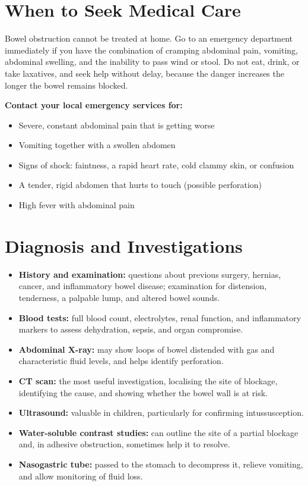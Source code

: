 \section*{When to Seek Medical Care}
Bowel obstruction cannot be treated at home. Go to an emergency department immediately if you have the combination of cramping abdominal pain, vomiting, abdominal swelling, and the inability to pass wind or stool. Do not eat, drink, or take laxatives, and seek help without delay, because the danger increases the longer the bowel remains blocked.

\textbf{Contact your local emergency services for:}
\begin{itemize}
    \item Severe, constant abdominal pain that is getting worse
    \item Vomiting together with a swollen abdomen
    \item Signs of shock: faintness, a rapid heart rate, cold clammy skin, or confusion
    \item A tender, rigid abdomen that hurts to touch (possible perforation)
    \item High fever with abdominal pain
\end{itemize}

\section*{Diagnosis and Investigations}
\begin{itemize}
    \item \textbf{History and examination:} questions about previous surgery, hernias, cancer, and inflammatory bowel disease; examination for distension, tenderness, a palpable lump, and altered bowel sounds.
    \item \textbf{Blood tests:} full blood count, electrolytes, renal function, and inflammatory markers to assess dehydration, sepsis, and organ compromise.
    \item \textbf{Abdominal X-ray:} may show loops of bowel distended with gas and characteristic fluid levels, and helps identify perforation.
    \item \textbf{CT scan:} the most useful investigation, localising the site of blockage, identifying the cause, and showing whether the bowel wall is at risk.
    \item \textbf{Ultrasound:} valuable in children, particularly for confirming intussusception.
    \item \textbf{Water-soluble contrast studies:} can outline the site of a partial blockage and, in adhesive obstruction, sometimes help it to resolve.
    \item \textbf{Nasogastric tube:} passed to the stomach to decompress it, relieve vomiting, and allow monitoring of fluid loss.
\end{itemize}

